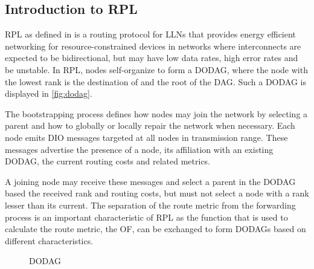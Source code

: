\documentclass[
  a4paper,
  11pt,
  style=screen,
  extramargin,
  bcor=10mm,
  rgb,
  hyperrefdark,
  abstract=off,
  lnum,
]{tubsartcl}
\begin{document}
\subsection{Introduction to RPL}

\ac{RPL} as defined in \cite{rfc6550} is a routing protocol for \acp{LLN} that provides energy efficient networking for resource-constrained devices in networks where interconnects are expected to be bidirectional, but may have low data rates, high error rates and be unstable.
In \ac{RPL}, nodes self-organize to form a \ac{DODAG}, where the node with the lowest rank is the destination of and the root of the \ac{DAG}.
Such a \ac{DODAG} is displayed in \autoref{fig:dodag}.

The bootstrapping process defines how nodes may join the network by selecting a parent and how to globally or locally repair the network when necessary.
Each node emits \ac{DIO} messages targeted at all nodes in transmission range.
These messages advertise the presence of a node, its affiliation with an existing \ac{DODAG}, the current routing costs and related metrics.

A joining node may receive these messages and select a parent in the \ac{DODAG} based the received rank and routing costs, but must not select a node with a rank lesser than its current.
The separation of the route metric from the forwarding process is an important characteristic of \ac{RPL} as the function that is used to calculate the route metric, the \ac{OF}, can be exchanged to form \acp{DODAG} based on different characteristics.

\begin{figure}[h]
  \centering
  \caption{\acf{DODAG}}
  \label{fig:dodag}
\end{figure}
\end{document}
